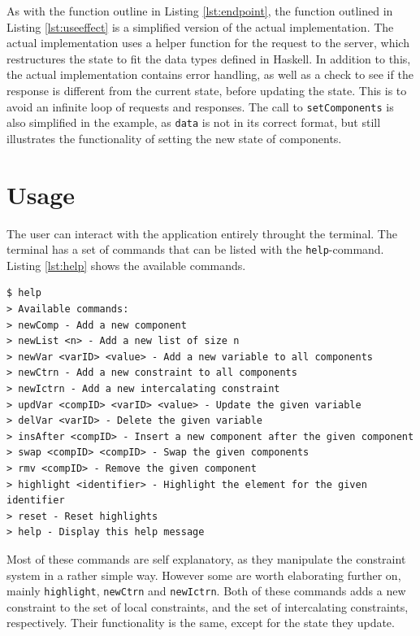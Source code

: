 \documentclass[11pt, a4paper]{article}
\begin{document}
As with the function outline in Listing \ref{lst:endpoint}, the function outlined in Listing \ref{lst:useeffect} is a simplified version of the actual implementation. The actual implementation uses a helper function for the request to the server, which restructures the state to fit the data types defined in Haskell. In addition to this, the actual implementation contains error handling, as well as a check to see if the response is different from the current state, before updating the state. This is to avoid an infinite loop of requests and responses. The call to \texttt{setComponents} is also simplified in the example, as \texttt{data} is not in its correct format, but still illustrates the functionality of setting the new state of components.

\section{Usage}
\label{sec:usage}
The user can interact with the application entirely throught the terminal. The terminal has a set of commands that can be listed with the \texttt{help}-command. Listing \ref{lst:help} shows the available commands.

\begin{lstlisting}[caption={Available commands in the terminal.}, label={lst:help}]
$ help
> Available commands:
> newComp - Add a new component
> newList <n> - Add a new list of size n
> newVar <varID> <value> - Add a new variable to all components
> newCtrn - Add a new constraint to all components
> newIctrn - Add a new intercalating constraint
> updVar <compID> <varID> <value> - Update the given variable
> delVar <varID> - Delete the given variable
> insAfter <compID> - Insert a new component after the given component
> swap <compID> <compID> - Swap the given components
> rmv <compID> - Remove the given component
> highlight <identifier> - Highlight the element for the given identifier
> reset - Reset highlights
> help - Display this help message
\end{lstlisting}

Most of these commands are self explanatory, as they manipulate the constraint system in a rather simple way. However some are worth elaborating further on, mainly \texttt{highlight}, \texttt{newCtrn} and \texttt{newIctrn}. Both of these commands adds a new constraint to the set of local constraints, and the set of intercalating constraints, respectively. Their functionality is the same, except for the state they update.
\end{document}
